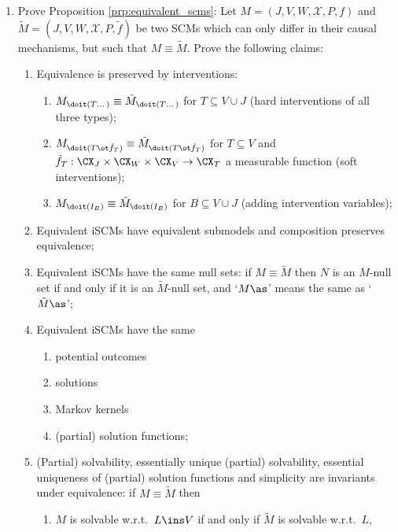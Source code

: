 \begin{enumerate}[label=10.\arabic*]
    \item %
    Prove Proposition \ref*{prp:equivalent_scms}: Let $M = (J, V, W, \mathcal{X}, P, f)$ and $\tilde{M} = (J, V, W, \mathcal{X}, P, \tilde{f})$ be two SCMs which can only differ in their causal mechanisms, but such that $M \equiv \tilde{M}$. Prove the following claims:
    \begin{enumerate}
        \item Equivalence is preserved by interventions:
        \begin{enumerate}
            \item $M_{\doit(T\dots)} \equiv \tilde{M}_{\doit(T\dots)}$ for $T \subseteq V \cup J$ (hard interventions of all three types);
            \item $M_{\doit(T\ot\hat{f}_T)} \equiv \tilde{M}_{\doit(T\ot\hat{f}_T)}$ for $T \subseteq V$ and $\hat f_T : \CX_J \times \CX_W \times \CX_V \to \CX_T$ a measurable function
            (soft interventions);
            \item $M_{\doit(I_B)} \equiv \tilde{M}_{\doit(I_B)}$ for $B \subseteq V \cup J$ (adding intervention variables);
        \end{enumerate}
        \item Equivalent iSCMs have equivalent submodels and composition preserves equivalence;
        \item Equivalent iSCMs have the same null sets:
        if $M \equiv \tilde{M}$ then $N$ is an $M$-null set if and only if it is an $\tilde{M}$-null set, and `$M\as$' means the same as `$\tilde{M}\as$';
        \item Equivalent iSCMs have the same
        \begin{enumerate}
            \item potential outcomes
            \item solutions
            \item Markov kernels
            \item (partial) solution functions;
        \end{enumerate}
        \item (Partial) solvability, essentially unique (partial) solvability, essential uniqueness of (partial) solution functions and simplicity are invariants under equivalence:
        if $M \equiv \tilde{M}$ then
        \begin{enumerate}
            \item $M$ is solvable w.r.t.\ $L \ins V$ if and only if $\tilde{M}$ is solvable w.r.t.\ $L$,

\end{enumerate}
\end{enumerate}
\end{enumerate}
